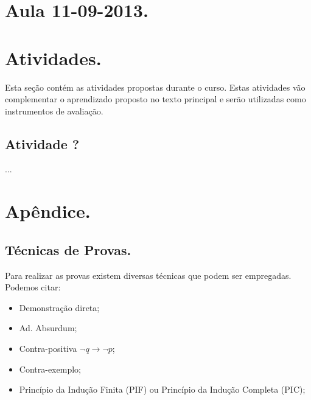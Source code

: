 \documentclass[a4paper,12pt]{article}
\begin{document}

\section{Aula 11-09-2013.}

\section{Atividades.}

Esta seção contém as atividades propostas durante o curso. Estas atividades vão complementar o aprendizado proposto no texto principal e serão utilizadas como instrumentos de avaliação.

\subsection{Atividade ?}

...

\section{Apêndice.}

\subsection{Técnicas de Provas.}

Para realizar as provas existem diversas técnicas que podem ser empregadas. Podemos citar:
\begin{itemize}
\item Demonstração direta;
\item Ad. Absurdum;
\item Contra-positiva $\neg q \rightarrow \neg p$;
\item Contra-exemplo;
\item Princípio da Indução Finita (PIF) ou Princípio da Indução Completa (PIC);
\end{itemize}

\nocite{*}


\end{document}
